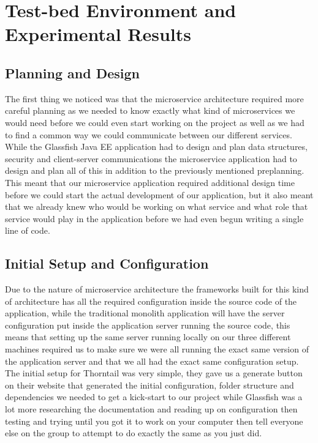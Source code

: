 \section{Test-bed Environment and Experimental Results}
\label{sec:experiments}

\subsection{Planning and Design}
The first thing we noticed was that the microservice architecture required more careful planning as we needed to know exactly what kind of microservices we would need before we could even start working on the project as well as we had to find a common way we could communicate between our different services. While the Glassfish Java EE application had to design and plan data structures, security and client-server communications the microservice application had to design and plan all of this in addition to the previously mentioned preplanning. This meant that our microservice application required additional design time before we could start the actual development of our application, but it also meant that we already knew who would be working on what service and what role that service would play in the application before we had even begun writing a single line of code.

\subsection{Initial Setup and Configuration}
Due to the nature of microservice architecture the frameworks built for this kind of architecture has all the required configuration inside the source code of the application, while the traditional monolith application will have the server configuration put inside the application server running the source code, this means that setting up the same server running locally on our three different machines required us to make sure we were all running the exact same version of the application server and that we all had the exact same configuration setup. The initial setup for Thorntail was very simple, they gave us a generate button on their website that generated the initial configuration, folder structure and dependencies we needed to get a kick-start to our project while Glassfish was a lot more researching the documentation and reading up on configuration then testing and trying until you got it to work on your computer then tell everyone else on the group to attempt to do exactly the same as you just did.

